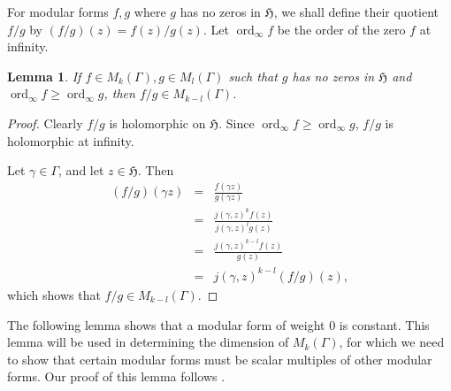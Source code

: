 \documentclass{article}
\newtheorem{lemma}[theorem]{Lemma}
\DeclareMathOperator{\ord}{ord}
\begin{document}
For modular forms $f,g$ where $g$ has no zeros in $\mathfrak{H}$, we shall define their quotient $f/g$ by
$(f/g)(z)=f(z)/g(z)$. Let $\ord_{\infty} f$ be the order of the zero $f$ at infinity.

\begin{lemma}
\label{lemma:quotient}
If $f \in M_k(\Gamma), g \in M_l(\Gamma)$ such that $g$ has no zeros in $\mathfrak{H}$ and $\ord_\infty f \geq \ord_\infty g$, then $f/g \in M_{k-l}(\Gamma)$.
\end{lemma}
\begin{proof}
Clearly $f/g$ is holomorphic on $\mathfrak{H}$. Since $\ord_\infty f \geq \ord_\infty g$, $f/g$ is holomorphic at infinity. 

Let $\gamma \in \Gamma$, and let $z \in \mathfrak{H}$. Then
\begin{eqnarray*}
(f/g)(\gamma z)&=&\frac{f(\gamma z)}{g(\gamma z)}\\
&=&\frac{j(\gamma,z)^k f(z)}{j(\gamma,z)^l g(z)}\\
&=&\frac{j(\gamma,z)^{k-l}f(z)}{g(z)}\\
&=&j(\gamma,z)^{k-l}(f/g)(z),
\end{eqnarray*}
which shows that $f/g \in M_{k-l}(\Gamma)$.
\end{proof}

The following lemma shows that a modular form of weight 0 is constant. This lemma will be used in determining the dimension
of $M_k(\Gamma)$, for which we need to show that
certain modular forms must be scalar multiples of other
modular forms.
Our proof of this lemma follows \cite[Chapter IX, Notes on \S 9.11]{MR0106147}.
\end{document}
